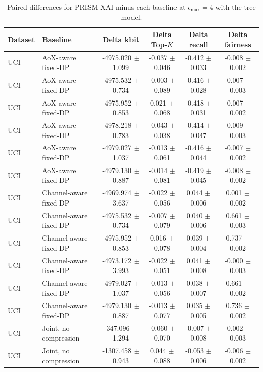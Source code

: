 \begin{table}[t]
\caption{Paired differences for PRISM-XAI minus each baseline at $\epsilon_{\max}=4$ with the tree model.}
\label{tab:paired-differences}
\centering
\scriptsize
\setlength{\tabcolsep}{3pt}
\begin{tabular}{llcccc}
\toprule
Dataset & Baseline & Delta kbit & Delta Top-$K$ & Delta recall & Delta fairness \\
\midrule
UCI & AoX-aware fixed-DP & -4975.020 $\pm$ 1.099 & -0.037 $\pm$ 0.046 & -0.412 $\pm$ 0.033 & -0.008 $\pm$ 0.002 \\
UCI & AoX-aware fixed-DP & -4975.532 $\pm$ 0.734 & -0.003 $\pm$ 0.089 & -0.416 $\pm$ 0.028 & -0.007 $\pm$ 0.003 \\
UCI & AoX-aware fixed-DP & -4975.952 $\pm$ 0.853 & 0.021 $\pm$ 0.068 & -0.418 $\pm$ 0.031 & -0.007 $\pm$ 0.002 \\
UCI & AoX-aware fixed-DP & -4978.218 $\pm$ 0.783 & -0.043 $\pm$ 0.038 & -0.414 $\pm$ 0.047 & -0.009 $\pm$ 0.003 \\
UCI & AoX-aware fixed-DP & -4979.027 $\pm$ 1.037 & -0.013 $\pm$ 0.061 & -0.416 $\pm$ 0.044 & -0.007 $\pm$ 0.002 \\
UCI & AoX-aware fixed-DP & -4979.130 $\pm$ 0.887 & -0.014 $\pm$ 0.081 & -0.419 $\pm$ 0.045 & -0.008 $\pm$ 0.002 \\
UCI & Channel-aware fixed-DP & -4969.974 $\pm$ 3.637 & -0.022 $\pm$ 0.056 & 0.044 $\pm$ 0.006 & 0.001 $\pm$ 0.002 \\
UCI & Channel-aware fixed-DP & -4975.532 $\pm$ 0.734 & -0.007 $\pm$ 0.079 & 0.040 $\pm$ 0.006 & 0.661 $\pm$ 0.003 \\
UCI & Channel-aware fixed-DP & -4975.952 $\pm$ 0.853 & 0.016 $\pm$ 0.078 & 0.039 $\pm$ 0.004 & 0.737 $\pm$ 0.002 \\
UCI & Channel-aware fixed-DP & -4973.172 $\pm$ 3.993 & -0.022 $\pm$ 0.051 & 0.041 $\pm$ 0.008 & -0.000 $\pm$ 0.003 \\
UCI & Channel-aware fixed-DP & -4979.027 $\pm$ 1.037 & -0.013 $\pm$ 0.056 & 0.038 $\pm$ 0.007 & 0.661 $\pm$ 0.002 \\
UCI & Channel-aware fixed-DP & -4979.130 $\pm$ 0.887 & -0.013 $\pm$ 0.077 & 0.035 $\pm$ 0.005 & 0.736 $\pm$ 0.002 \\
UCI & Joint, no compression & -347.096 $\pm$ 1.294 & -0.060 $\pm$ 0.070 & -0.007 $\pm$ 0.008 & -0.002 $\pm$ 0.003 \\
UCI & Joint, no compression & -1307.458 $\pm$ 0.943 & 0.044 $\pm$ 0.088 & -0.053 $\pm$ 0.006 & -0.006 $\pm$ 0.002 \\

\end{tabular}
\end{table}
